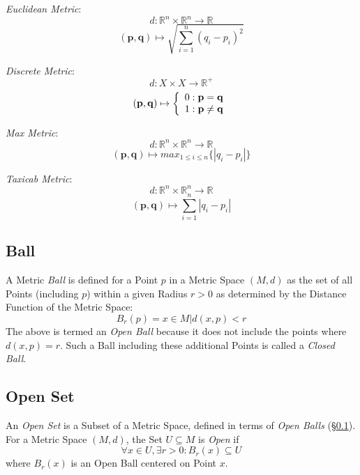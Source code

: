 \emph{Euclidean Metric}:
\[
  d: \mathbb{R}^n \times \mathbb{R}^n \rightarrow \mathbb{R}
\]\[
  (\mathbf{p},\mathbf{q}) \mapsto \sqrt{\sum_{i=1}^{n}(q_i - p_i)^2}
\]

\emph{Discrete Metric}:
\[
  d: X \times X \rightarrow \mathbb{R}^{+}
\]\[
  (\mathbf{p},\mathbf{q}) \mapsto \left\{
  \begin{array}{l l}
    0: \mathbf{p} = \mathbf{q}\\
    1: \mathbf{p} \neq \mathbf{q}
  \end{array}\right.
\]

\emph{Max Metric}:
\[
  d: \mathbb{R}^n \times \mathbb{R}^n \rightarrow \mathbb{R}
\]\[
  (\mathbf{p},\mathbf{q}) \mapsto max_{1 \leq i \leq n}\{|q_i - p_i|\}
\]

\emph{Taxicab Metric}:
\[
  d: \mathbb{R}^n \times \mathbb{R}^n \rightarrow \mathbb{R}
\]\[
  (\mathbf{p},\mathbf{q}) \mapsto \sum_{i=1}^{n}|q_i - p_i|
\]



\subsection{Ball}\label{sec:metric_ball}

A Metric \emph{Ball} is defined for a Point $p$ in a Metric Space
$(M,d)$ as the set of all Points (including $p$) within a given Radius
$r > 0$ as determined by the Distance Function of the Metric Space:
\[
  B_r(p) = {x \in M | d(x,p) < r }
\]
The above is termed an \emph{Open Ball} because it does not include
the points where $d(x,p) = r$. Such a Ball including these additional
Points is called a \emph{Closed Ball}.



\subsection{Open Set}\label{sec:open_set}

An \emph{Open Set} is a Subset of a Metric Space, defined in terms of
\emph{Open Balls} (\S\ref{sec:metric_ball}). For a Metric Space
$(M,d)$, the Set $U \subseteq M$ is \emph{Open} if
\[
  \forall x \in U, \exists r > 0 : B_r(x) \subseteq U
\]
where $B_r(x)$ is an Open Ball centered on Point $x$.

